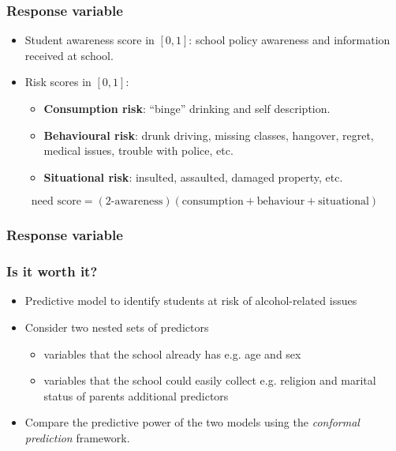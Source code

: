 \documentclass{beamer}
\begin{document}
\begin{frame} \frametitle{Response variable}

\begin{itemize}
  \item Student awareness score in $[0,1]$: school policy awareness and information received at school.
  \item Risk scores in $[0,1]$:
    \begin{itemize}
       \item \textbf{Consumption risk}: ``binge'' drinking and self description.
       \item \textbf{Behavioural risk}: drunk driving, missing classes, hangover, regret, medical issues, trouble with police, etc.
       \item \textbf{Situational risk}: insulted, assaulted, damaged property, etc.
    \end{itemize}
\end{itemize}

$$
  \text{need score} = (\text{2-awareness}) (\text{consumption} + \text{behaviour} + \text{situational})
$$



\end{frame}

\begin{frame} \frametitle{Response variable}


\end{frame}

\begin{frame}
  
\end{frame}


\begin{frame} \frametitle{Is it worth it?}


\begin{itemize}
	\item Predictive model to identify students at risk of alcohol-related issues
	\item Consider two nested sets of predictors
	\begin{itemize}
		\item variables that the school already has e.g. age and sex
		\item variables that the school could easily collect e.g. religion and marital status of parents additional predictors
	\end{itemize}
	  \item Compare the predictive power of the two models using the \textit{conformal prediction} framework.
\end{itemize}
\end{frame}
\end{document}
